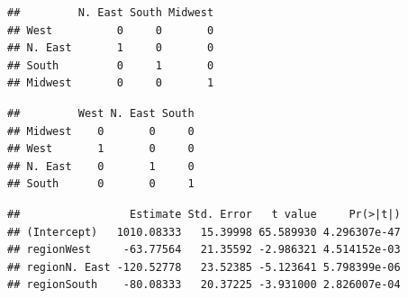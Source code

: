 \documentclass[]{book}
\newenvironment{Shaded}{\begin{snugshade}}{\end{snugshade}}
\newcommand{\CommentTok}[1]{\textcolor[rgb]{0.56,0.35,0.01}{\textit{#1}}}
\newcommand{\DataTypeTok}[1]{\textcolor[rgb]{0.13,0.29,0.53}{#1}}
\newcommand{\DecValTok}[1]{\textcolor[rgb]{0.00,0.00,0.81}{#1}}
\newcommand{\KeywordTok}[1]{\textcolor[rgb]{0.13,0.29,0.53}{\textbf{#1}}}
\newcommand{\NormalTok}[1]{#1}
\newcommand{\OperatorTok}[1]{\textcolor[rgb]{0.81,0.36,0.00}{\textbf{#1}}}
\newcommand{\StringTok}[1]{\textcolor[rgb]{0.31,0.60,0.02}{#1}}
\begin{document}
\begin{Shaded}
\end{Shaded}

\begin{verbatim}
##         N. East South Midwest
## West          0     0       0
## N. East       1     0       0
## South         0     1       0
## Midwest       0     0       1
\end{verbatim}

\begin{Shaded}
\end{Shaded}

\begin{verbatim}
##         West N. East South
## Midwest    0       0     0
## West       1       0     0
## N. East    0       1     0
## South      0       0     1
\end{verbatim}

\begin{Shaded}
\end{Shaded}

\begin{verbatim}
##                 Estimate Std. Error   t value     Pr(>|t|)
## (Intercept)   1010.08333   15.39998 65.589930 4.296307e-47
## regionWest     -63.77564   21.35592 -2.986321 4.514152e-03
## regionN. East -120.52778   23.52385 -5.123641 5.798399e-06
## regionSouth    -80.08333   20.37225 -3.931000 2.826007e-04
\end{verbatim}
\end{document}
